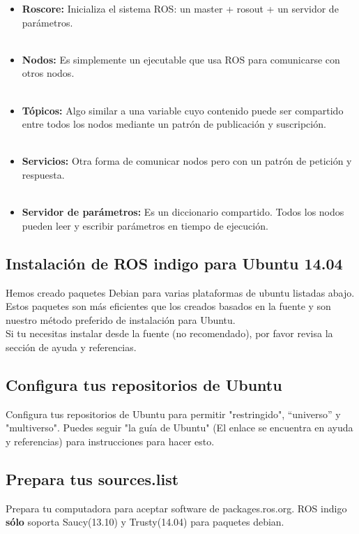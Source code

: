 \documentclass[user_manual.tex]{subfiles}
\begin{document}
\begin{itemize}
\item \textbf{Roscore:} Inicializa el sistema ROS: un master + rosout + un servidor de parámetros.\\
\\	
\item \textbf{Nodos:} Es simplemente un ejecutable que usa ROS para comunicarse con otros nodos.\\
\\
\item \textbf{Tópicos:} Algo similar a una variable cuyo contenido puede ser compartido entre todos los nodos mediante un patrón de
publicación y suscripción.\\
\\
\item \textbf{Servicios:} Otra forma de comunicar nodos pero con un patrón de petición y respuesta.\\
\\
\item \textbf{Servidor de parámetros:} Es un diccionario compartido. Todos los nodos pueden leer y escribir parámetros en tiempo de ejecución.\\
\end{itemize}

\subsection{Instalación de ROS indigo para Ubuntu 14.04}
Hemos creado paquetes Debian para varias plataformas de ubuntu listadas abajo. Estos paquetes son más eficientes que 
los creados basados en la fuente y son nuestro método preferido de instalación para Ubuntu.\\

Si tu necesitas instalar desde la fuente (no recomendado), por favor revisa la sección de ayuda y referencias.\\

\subsection{Configura tus repositorios de Ubuntu}
Configura tus repositorios de Ubuntu para permitir "restringido", ``universo'' y "multiverso". Puedes seguir "la guía de 
Ubuntu" (El enlace se encuentra en ayuda y referencias) para instrucciones para hacer esto.\\

\subsection{Prepara tus sources.list}
Prepara tu computadora para aceptar software de packages.ros.org. ROS indigo \textbf{sólo} soporta Saucy(13.10) y 
Trusty(14.04) para paquetes debian.
\end{document}
